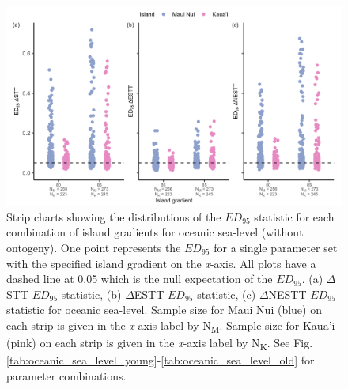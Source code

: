 \begin{figure}
    \centering
    \includegraphics[width=\textwidth]{JBI-21-0508_FigS7.png}
    \caption{Strip charts showing the distributions of the $ED_{95}$ statistic for each combination of island gradients for oceanic sea-level (without ontogeny). One point represents the $ED_{95}$ for a single parameter set with the specified island gradient on the \textit{x}-axis. All plots have a dashed line at 0.05 which is the null expectation of the $ED_{95}$. (a) $\Delta$STT $ED_{95}$ statistic, (b) $\Delta$ESTT $ED_{95}$ statistic, (c) $\Delta$NESTT $ED_{95}$ statistic for oceanic sea-level. Sample size for Maui Nui (blue) on each strip is given in the \textit{x}-axis label by N\textsubscript{M}. Sample size for Kaua'i (pink) on each strip is given in the \textit{x}-axis label by N\textsubscript{K}. See Fig. \ref{tab:oceanic_sea_level_young}-\ref{tab:oceanic_sea_level_old} for parameter combinations.}
    \label{fig:oceanic_sea_level_gradient_nltt}
\end{figure}

